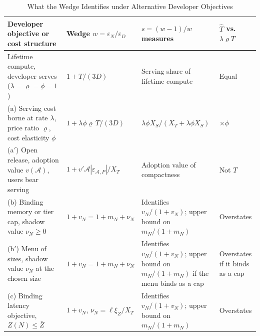 \begin{table}[tp]
\centering
\caption{What the Wedge Identifies under Alternative Developer Objectives}
\label{tab:app-wedge-cases}
\footnotesize
\setlength{\tabcolsep}{3pt}
\begin{tabular}{@{}>{\raggedright\arraybackslash}p{} >{\raggedright\arraybackslash}p{} >{\raggedright\arraybackslash}p{} >{\raggedright\arraybackslash}p{}@{}}
\toprule
Developer objective or cost structure & Wedge $w=\varepsilon_N/\varepsilon_D$ & $s=(w-1)/w$ measures & $\hat T$ vs.\ $\lambda\varrho T$ \\
\midrule
Lifetime compute, developer serves ($\lambda=\varrho=\phi=1$) & $1+T/(3D)$ & Serving share of lifetime compute & Equal \\
(a) Serving cost borne at rate $\lambda$, price ratio $\varrho$, cost elasticity $\phi$ & $1+\lambda\phi\varrho\,T/(3D)$ & $\lambda\phi X_S/(X_T+\lambda\phi X_S)$ & $\times\phi$ \\
(a$'$) Open release, adoption value $v(\mathcal A)$, users bear serving & $1+v'\mathcal A|\varepsilon_{\mathcal A,P}|/X_T$ & Adoption value of compactness & Not $T$ \\
(b) Binding memory or tier cap, shadow value $\nu_N\ge0$ & $1+v_N=1+m_N+\nu_N$ & Identifies $v_N/(1+v_N)$; upper bound on $m_N/(1+m_N)$ & Overstates \\
(b$'$) Menu of sizes, shadow value $\nu_N$ at the chosen size & $1+v_N=1+m_N+\nu_N$ & Identifies $v_N/(1+v_N)$; upper bound on $m_N/(1+m_N)$ if the menu binds as a cap & Overstates if it binds as a cap \\
(c) Binding latency objective, $Z(N)\le\bar Z$ & $1+v_N$, $\nu_N=\ell\xi_Z/X_T$ & Identifies $v_N/(1+v_N)$; upper bound on $m_N/(1+m_N)$ & Overstates \\
\bottomrule
\end{tabular}
\end{table}

